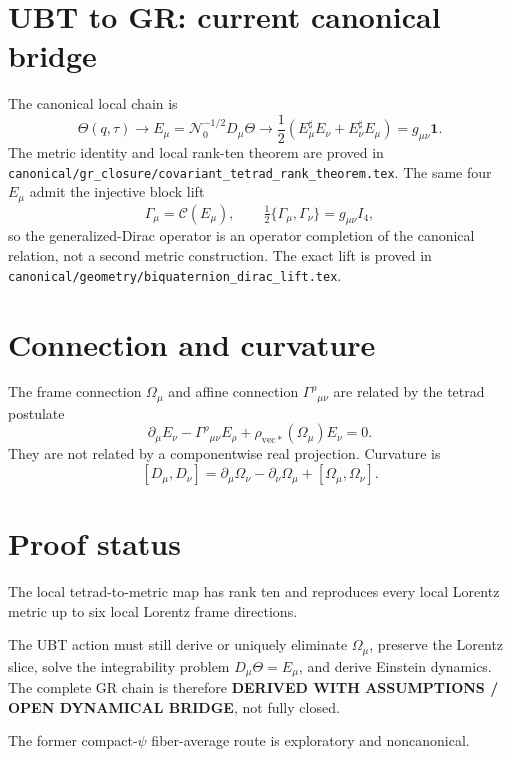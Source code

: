 \documentclass[11pt,a4paper]{article}
\begin{document}
\section{UBT to GR: current canonical bridge}

The canonical local chain is
\[
 \Theta(q,\tau)
 \longrightarrow E_\mu=\mathcal N_0^{-1/2}D_\mu\Theta
 \longrightarrow
 \frac12(E_\mu^\sharp E_\nu+E_\nu^\sharp E_\mu)
 =g_{\mu\nu}\mathbf1.
\]
The metric identity and local rank-ten theorem are proved in
\texttt{canonical/gr\_closure/covariant\_tetrad\_rank\_theorem.tex}.
The same four $E_\mu$ admit the injective block lift
\[
 \Gamma_\mu=\mathcal C(E_\mu),\qquad
 \tfrac12\{\Gamma_\mu,\Gamma_\nu\}=g_{\mu\nu}I_4,
\]
so the generalized-Dirac operator is an operator completion of the canonical
relation, not a second metric construction.  The exact lift is proved in
\texttt{canonical/geometry/biquaternion\_dirac\_lift.tex}.

\section{Connection and curvature}
The frame connection $\Omega_\mu$ and affine connection
$\Gamma^\rho{}_{\mu\nu}$ are related by the tetrad postulate
\[
 \partial_\mu E_\nu-\Gamma^\rho{}_{\mu\nu}E_\rho
 +\rho_{\mathrm{vec}*}(\Omega_\mu)E_\nu=0.
\]
They are not related by a componentwise real projection.  Curvature is
\[
 [D_\mu,D_\nu]
 =\partial_\mu\Omega_\nu-\partial_\nu\Omega_\mu
 +[\Omega_\mu,\Omega_\nu].
\]

\section{Proof status}
\begin{tcolorbox}[colback=green!5!white,colframe=green!60!black,title=Closed]
The local tetrad-to-metric map has rank ten and reproduces every local Lorentz
metric up to six local Lorentz frame directions.
\end{tcolorbox}

\begin{tcolorbox}[colback=yellow!7!white,colframe=orange!70!black,title=Open]
The UBT action must still derive or uniquely eliminate $\Omega_\mu$, preserve
the Lorentz slice, solve the integrability problem $D_\mu\Theta=E_\mu$, and
derive Einstein dynamics.  The complete GR chain is therefore
\textbf{DERIVED WITH ASSUMPTIONS / OPEN DYNAMICAL BRIDGE}, not fully closed.
\end{tcolorbox}

The former compact-$\psi$ fiber-average route is exploratory and noncanonical.
\end{document}
